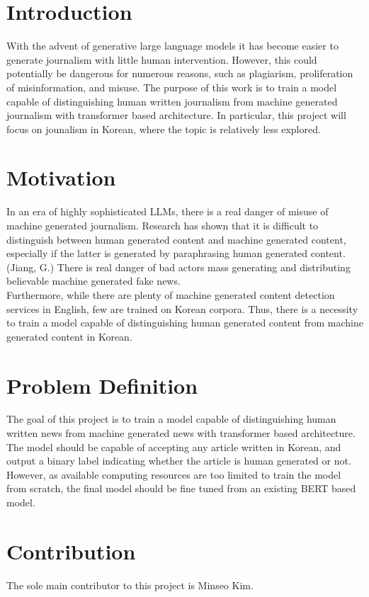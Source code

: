 \documentclass{article}
\begin{document}
\section{Introduction}
With the advent of generative large language models it has become easier to generate journalism with little human intervention.
However, this could potentially be dangerous for numerous reasons, such as plagiarism, proliferation of misinformation, and misuse.
The purpose of this work is to train a model capable of distinguishing human written journalism from machine generated journalism with transformer based architecture.
In particular, this project will focus on jounalism in Korean, where the topic is relatively less explored.

\section{Motivation}
In an era of highly sophisticated LLMs, there is a real danger of misuse of machine generated journalism.
Research has shown that it is difficult to distinguish between human generated content and machine generated content, especially if the latter is generated by paraphrasing human generated content. (Jiang, G.)
There is real danger of bad actors mass generating and distributing believable machine generated fake news. \\
Furthermore, while there are plenty of machine generated content detection services in English, few are trained on Korean corpora.
Thus, there is a necessity to train a model capable of distinguishing human generated content from machine generated content in Korean.

\section{Problem Definition}
The goal of this project is to train a model capable of distinguishing human written news from machine generated news with transformer based architecture.
The model should be capable of accepting any article written in Korean, and output a binary label indicating whether the article is human generated or not.
However, as available computing resources are too limited to train the model from scratch, the final model should be fine tuned from an existing BERT based model.

\section{Contribution}
The sole main contributor to this project is Minseo Kim.
\end{document}
